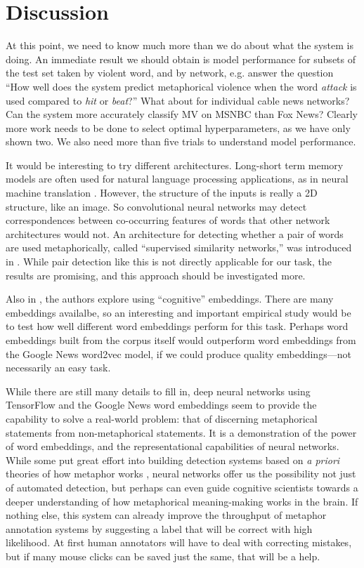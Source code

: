 \documentclass[11pt,letterpaper]{amsart}
\begin{document}


\section{Discussion}\label{discussion}

At this point, we need to know much more than we do about what the system is
doing. An immediate result we should obtain is model performance for subsets
of the test set taken by violent word, and by network, e.g. answer the
question ``How well does the system predict metaphorical violence when the
word \emph{attack} is used compared to \emph{hit} or \emph{beat}?'' What about
for individual cable news networks? Can the system more accurately classify
MV on MSNBC than Fox News?
Clearly more work needs to be done to select optimal hyperparameters, as we
have only shown two. We also need more than five trials to understand model
performance.

It would be interesting to try different architectures. Long-short term
memory models are often used for natural language processing applications,
as in neural machine translation \cite{Wu2013, Sutskever2014}. However, the
structure of the inputs is really a 2D structure, like an image. So convolutional
neural networks may detect correspondences between co-occurring features of
words that other network architectures would not. An architecture for detecting
whether a pair of words are used metaphorically, called ``supervised similarity
networks,'' was introduced in \cite{Rei2017}. While pair detection like this
is not directly applicable for our task, the results are promising, and 
this approach should be investigated more. 

Also in \cite{Rei2017}, the authors explore using ``cognitive'' embeddings.
There are many embeddings availalbe, so an interesting and important 
empirical study would be to test how well different word embeddings perform
for this task. Perhaps word embeddings built from the corpus itself would
outperform word embeddings from the Google News word2vec model, if we could
produce quality embeddings---not necessarily an easy task.

While there are still many details to fill in, deep neural networks using 
TensorFlow and the Google News word embeddings seem to provide the capability
to solve a real-world problem: that of discerning metaphorical statements
from non-metaphorical statements. It is a demonstration of the power of 
word embeddings, and the representational capabilities of neural networks. 
While some put great effort into building detection systems based on
\textit{a priori} theories of how metaphor works \cite{Dodge2015}, 
neural networks offer us
the possibility not just of automated detection, but perhaps can even guide
cognitive scientists towards a deeper understanding of how metaphorical 
meaning-making works in the brain. If nothing else, this system can already
improve the throughput of metaphor annotation systems by suggesting a label 
that will be correct with high likelihood. At first human annotators will
have to deal with correcting mistakes, but if many mouse clicks can be saved
just the same, that will be a help.




\end{document}
